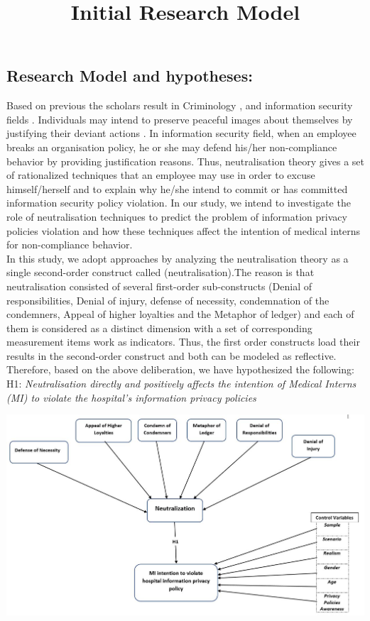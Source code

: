 \subsection{Research Model and hypotheses:}
Based on previous the scholars result in Criminology  \cite{Sykes1957}, and information security fields \cite{Siponen2010,Teh2015,Kim2014}. Individuals may intend to preserve peaceful images about themselves by justifying their deviant actions \cite{Kim2014}. In information security field, when an employee breaks an organisation policy, he or she may defend his/her non-compliance behavior by providing justification reasons. Thus, neutralisation theory gives a set of rationalized techniques that an employee may use in order to excuse himself/herself and to explain why he/she intend to commit or has committed information security policy violation. In our study, we intend to investigate the role of neutralisation techniques to predict the problem of information privacy policies violation and how these techniques affect the intention of medical interns for non-compliance behavior.\\
In this study, we adopt  \cite{Siponen2010,Teh2015} approaches by analyzing the neutralisation theory as a single second-order construct called (neutralisation).The reason is that neutralisation consisted of several first-order sub-constructs (Denial of responsibilities, Denial of injury, defense of necessity, condemnation of the condemners, Appeal of higher loyalties and the Metaphor of ledger) and each of them is considered as a distinct dimension with a set of corresponding measurement items work as indicators. Thus, the first order constructs load their results in the second-order construct and both can be modeled as reflective. Therefore, based on the above deliberation, we have hypothesized the following:
\\H1: \textit{ Neutralisation directly and positively affects the intention of Medical Interns (MI) to violate the hospital's information privacy policies   \textbf{}} 

\graphicspath{ {image/} }
\begin{center}
\includegraphics [scale=0.4]{Research_Model_Fv.JPG}
\end{center}
\begin{center}
\title{ Initial Research Model}
\end{center}

